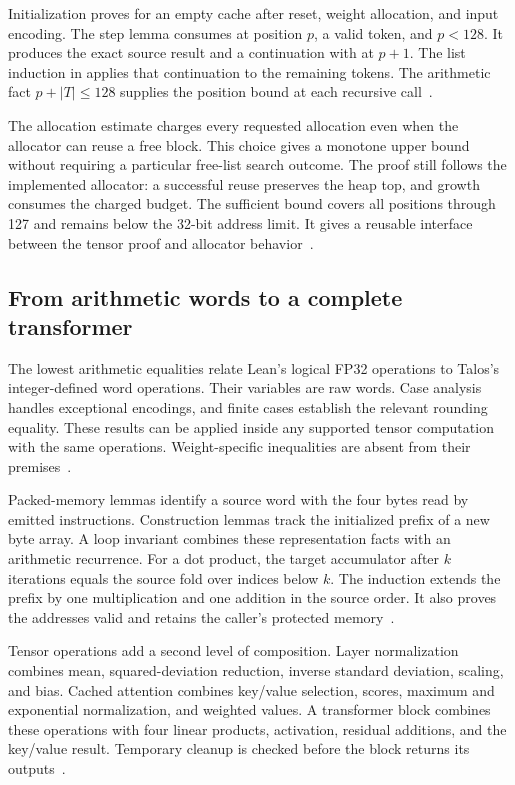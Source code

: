 Initialization proves  for an empty cache after reset, weight allocation, and input encoding.  The step lemma consumes  at position $p$, a valid token, and $p<128$.  It produces the exact source result and a continuation with  at $p+1$.  The list induction in  applies that continuation to the remaining tokens.  The arithmetic fact $p+|T|\leq128$ supplies the position bound at each recursive call~\cite{session}.

The allocation estimate charges every requested allocation even when the allocator can reuse a free block.  This choice gives a monotone upper bound without requiring a particular free-list search outcome.  The proof still follows the implemented allocator: a successful reuse preserves the heap top, and growth consumes the charged budget.  The sufficient bound covers all positions through 127 and remains below the 32-bit address limit.  It gives a reusable interface between the tensor proof and allocator behavior~\cite{budget}.

\subsection{From arithmetic words to a complete transformer}

The lowest arithmetic equalities relate Lean's logical FP32 operations to Talos's integer-defined word operations.  Their variables are raw words.  Case analysis handles exceptional encodings, and finite cases establish the relevant rounding equality.  These results can be applied inside any supported tensor computation with the same operations.  Weight-specific inequalities are absent from their premises~\cite{f32,leanfloat}.

Packed-memory lemmas identify a source word with the four bytes read by emitted instructions.  Construction lemmas track the initialized prefix of a new byte array.  A loop invariant combines these representation facts with an arithmetic recurrence.  For a dot product, the target accumulator after $k$ iterations equals the source fold over indices below $k$.  The induction extends the prefix by one multiplication and one addition in the source order.  It also proves the addresses valid and retains the caller's protected memory~\cite{packed,loops}.

Tensor operations add a second level of composition.  Layer normalization combines mean, squared-deviation reduction, inverse standard deviation, scaling, and bias.  Cached attention combines key/value selection, scores, maximum and exponential normalization, and weighted values.  A transformer block combines these operations with four linear products, activation, residual additions, and the key/value result.  Temporary cleanup is checked before the block returns its outputs~\cite{entry}.

